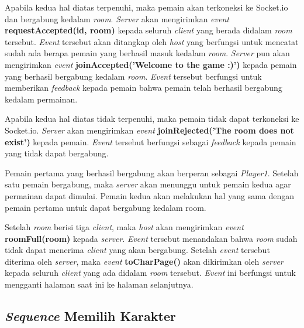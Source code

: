 Apabila kedua hal diatas terpenuhi, maka pemain akan terkoneksi ke Socket.io dan bergabung kedalam \textit{room}. \textit{Server} akan mengirimkan \textit{event} \textbf{requestAccepted(id, room)} kepada seluruh \textit{client} yang berada didalam \textit{room} tersebut. \textit{Event} tersebut akan ditangkap oleh \textit{host} yang berfungsi untuk mencatat sudah ada berapa pemain yang berhasil masuk kedalam \textit{room}. \textit{Server} pun akan mengirimkan \textit{event} \textbf{joinAccepted('Welcome to the game :)')} kepada pemain yang berhasil bergabung kedalam \textit{room}. \textit{Event} tersebut berfungsi untuk memberikan \textit{feedback} kepada pemain bahwa pemain telah berhasil bergabung kedalam permainan.

Apabila kedua hal diatas tidak terpenuhi, maka pemain tidak dapat terkoneksi ke Socket.io. \textit{Server} akan mengirimkan \textit{event} \textbf{joinRejected('The room does not exist')} kepada pemain. \textit{Event} tersebut berfungsi sebagai \textit{feedback} kepada pemain yang tidak dapat bergabung.

Pemain pertama yang berhasil bergabung akan berperan sebagai \textit{Player1}. Setelah satu pemain bergabung, maka \textit{server} akan menunggu untuk pemain kedua agar permainan dapat dimulai. Pemain kedua akan melakukan hal yang sama dengan pemain pertama untuk dapat bergabung kedalam room.

Setelah \textit{room} berisi tiga \textit{client}, maka \textit{host} akan mengirimkan \textit{event} \textbf{roomFull(room)} kepada \textit{server}. \textit{Event} tersebut menandakan bahwa \textit{room} sudah tidak dapat menerima \textit{client} yang akan bergabung. Setelah \textit{event} tersebut diterima oleh \textit{server}, maka \textit{event} \textbf{toCharPage()} akan dikirimkan oleh \textit{server} kepada seluruh \textit{client} yang ada didalam \textit{room} tersebut. \textit{Event} ini berfungsi untuk mengganti halaman saat ini ke halaman selanjutnya.

\subsection{\textit{Sequence} Memilih Karakter}


